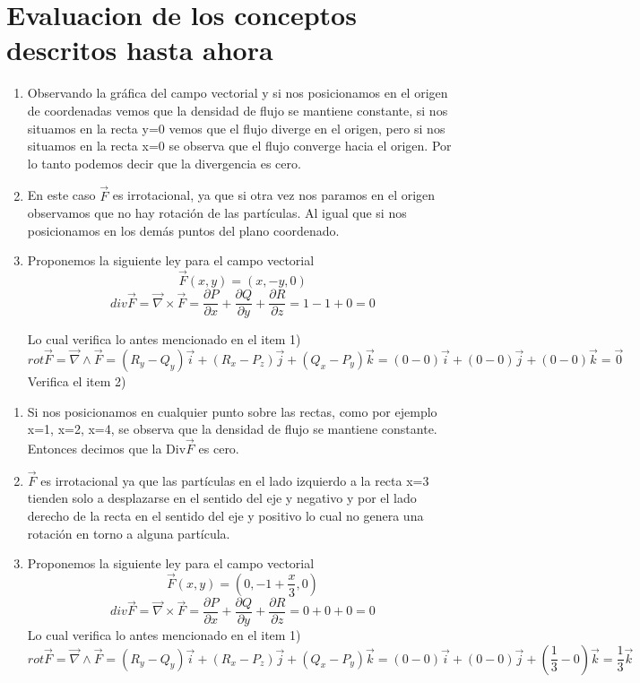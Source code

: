 \documentclass[10pt]{article}
\begin{document}
\section{Evaluacion de los conceptos descritos hasta ahora}
	\begin{enumerate}
		\item Observando la gráfica del campo vectorial y si nos posicionamos en el origen de coordenadas vemos que la densidad de flujo se mantiene constante, si nos situamos en la recta y=0 vemos que el flujo diverge en el origen, pero si nos situamos en la recta x=0 se observa que el flujo converge hacia el origen. Por lo tanto podemos decir que la divergencia es cero.
		\item En este caso $\vec{F}$ es irrotacional, ya que si otra vez nos paramos en el origen observamos que no hay rotación de las partículas. Al igual que si nos posicionamos en los demás puntos del plano coordenado.
		\item Proponemos la siguiente ley para el campo vectorial
			\[ \vec{F}(x,y) = (x,-y,0) \]
			\[ div\vec{F} = \vec{\nabla} \times \vec{F} = \frac{\partial P}{\partial x} + \frac{\partial Q}{\partial y} + \frac{\partial R}{\partial z} = 1 - 1 + 0 = 0 \]

			Lo cual verifica lo antes mencionado en el item 1)
			\[ rot\vec{F} = \vec{\nabla} \wedge \vec{F} = (R_y - Q_y)\vec{i} + (R_x - P_z)\vec{j} + (Q_x - P_y)\vec{k} = (0 - 0)\vec{i} + (0 - 0)\vec{j} + (0 - 0)\vec{k} = \vec{0} \]
			Verifica el item 2)
	\end{enumerate}


\begin{enumerate}
	\item  Si nos posicionamos en cualquier punto sobre las rectas, como por ejemplo x=1, x=2, x=4, se observa que la densidad de flujo se mantiene constante. Entonces decimos que la Div$\vec{F}$ es cero.
	\item $\vec{F}$ es irrotacional ya que las partículas en el lado izquierdo a la recta x=3 tienden solo a desplazarse en el sentido del eje y negativo y por el lado derecho de la recta en el sentido del eje y positivo lo cual no genera una rotación en torno a alguna partícula.
	\item Proponemos la siguiente ley para el campo vectorial
		\[ \vec{F}(x,y) = (0,-1+ \frac{x}{3} ,0) \]
		\[ div\vec{F} = \vec{\nabla} \times \vec{F} = \frac{\partial P}{\partial x} + \frac{\partial Q}{\partial y} + \frac{\partial R}{\partial z} = 0 + 0 + 0 = 0 \]
		Lo cual verifica lo antes mencionado en el item 1)
		\[ rot\vec{F} = \vec{\nabla} \wedge \vec{F} = (R_y - Q_y)\vec{i} + (R_x - P_z)\vec{j} + (Q_x - P_y)\vec{k} = (0 - 0)\vec{i} + (0 - 0)\vec{j} + ( \frac{1}{3}  - 0)\vec{k} = \frac{1}{3} \vec{k} \]
\end{enumerate}	
\end{document}
